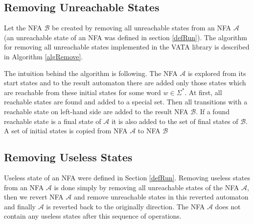 \subsection{Removing Unreachable States}
Let the NFA $\mathcal{B}$ be created by removing all unreachable states from an NFA $\mathcal{A}$ (an unreachable state of an NFA was defined in
section \ref{defRun}). The algorithm for removing all unreachable states implemented in the VATA library is described in Algorithm \ref{algRemove}.

The intuition behind the algorithm is following. The NFA $\mathcal{A}$ is explored from its start states and to the result automaton 
there are added only those states which are
reachable from these initial states for some word $w \in \Sigma^{*}$. At first, all reachable states are found and added to a special set. 
Then all transitions with a reachable state on left-hand side are added to the result NFA $\mathcal{B}$.
If a found reachable state is a final state of 
$\mathcal{A}$ it is also added to the set of final states of $\mathcal{B}$. A set of initial states is copied from
NFA $\mathcal{A}$ to NFA $\mathcal{B}$

\subsection{Removing Useless States}
Useless state of an NFA were defined in Section \ref{defRun}. Removing useless states from an NFA $\mathcal{A}$ is done simply by
removing all unreachable states of the NFA $\mathcal{A}$, 
then we revert NFA $\mathcal{A}$ and remove unreachable states in this reverted automaton and finally $\mathcal{A}$ is reverted back to the
originally direction. The NFA $\mathcal{A}$ does not contain any useless states after this sequence of operations.

